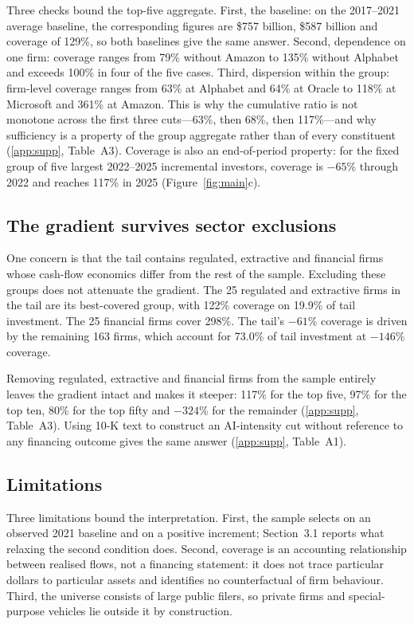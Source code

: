 \documentclass[preprint,11pt]{elsarticle}
\begin{document}
Three checks bound the top-five aggregate. First, the baseline: on the 2017--2021 average baseline,
the corresponding figures are \$757 billion, \$587 billion and coverage of 129\%, so both baselines
give the same answer. Second, dependence on one firm: coverage ranges from 79\% without Amazon to
135\% without Alphabet and exceeds 100\% in four of the five cases. Third, dispersion within the
group: firm-level coverage ranges from 63\% at Alphabet and 64\% at Oracle to 118\% at Microsoft and
361\% at Amazon. This is why the cumulative ratio is not monotone across the first three
cuts---63\%, then 68\%, then 117\%---and why sufficiency is a property of the group aggregate rather
than of every constituent (\ref{app:supp}, Table~A3). Coverage is also an end-of-period property:
for the fixed group of five largest 2022--2025 incremental investors, coverage is $-65$\% through
2022 and reaches 117\% in 2025 (Figure~\ref{fig:main}c).

\subsection{The gradient survives sector exclusions}\label{sec:comp}
One concern is that the tail contains regulated, extractive and financial firms whose cash-flow
economics differ from the rest of the sample. Excluding these groups does not attenuate the
gradient. The 25 regulated and extractive firms in the tail are its best-covered group, with 122\%
coverage on 19.9\% of tail investment. The 25 financial firms cover 298\%. The tail's $-61$\%
coverage is driven by the remaining 163 firms, which account for 73.0\% of tail investment at
$-146$\% coverage.

Removing regulated, extractive and financial firms from the sample entirely leaves the gradient
intact and makes it steeper: 117\% for the top five, 97\% for the top ten, 80\% for the top fifty
and $-324$\% for the remainder (\ref{app:supp}, Table~A3). Using 10-K text to construct an
AI-intensity cut without reference to any financing outcome gives the same answer (\ref{app:supp},
Table~A1).

\subsection{Limitations}\label{sec:lim}
Three limitations bound the interpretation. First, the sample selects on an observed 2021 baseline
and on a positive increment; Section~3.1 reports what relaxing the second condition does. Second,
coverage is an accounting relationship between realised flows, not a financing statement: it does
not trace particular dollars to particular assets and identifies no counterfactual of firm
behaviour. Third, the universe consists of large public filers, so private firms and special-purpose
vehicles lie outside it by construction.
\end{document}
